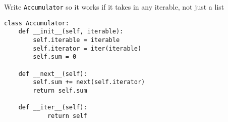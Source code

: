 \begin{blocksection}
\question Write \lstinline$Accumulator$ so it works if it takes in any
iterable, not just a list

\begin{solution}[1.5in]
\begin{lstlisting}
class Accumulator:
    def __init__(self, iterable):
        self.iterable = iterable
        self.iterator = iter(iterable)
        self.sum = 0

    def __next__(self):
        self.sum += next(self.iterator)
        return self.sum

    def __iter__(self):
            return self
\end{lstlisting}
\end{solution}
\end{blocksection}
